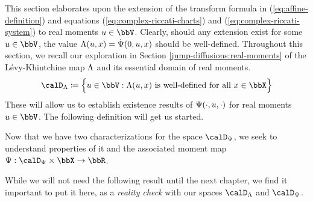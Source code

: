 This section elaborates upon the extension of the transform formula in (\ref{eq:affine-definition}) and equations (\ref{eq:complex-riccati-charts}) and (\ref{eq:complex-riccati-system}) to real moments $\momentVar \in \vecSpace$. 
Clearly, should any extension exist for some $\momentVar \in \vecSpace$, the value $\Lambda(u, x) = \dot{\Psi}(0,u,x)$ should be well-defined.
Throughout this section, we recall our exploration in Section \ref{jump-diffusions:real-moments} of the L\'evy-Khintchine map $\Lambda$ and its essential domain of real moments.
\begin{equation*}
  \odeSpace \defeq \Big\{ \momentVar \in \vecSpace : \ode(\momentVar, \stateVar) \text{ is well-defined for all } \stateVar \in \stateSpace \Big\}
\end{equation*}
These will allow us to establish existence results of $\Psi(\cdot, u, \cdot)$ for real moments $\momentVar \in \vecSpace$.
The following definition will get us started.





Now that we have two characterizations for the space $\momentSpace$, we seek to understand properties of it and the associated moment map $\aff: \momentSpace \times \stateSpace \rightarrow \bbR$.





While we will not need the following result until the next chapter, we find it important to put it here, as a \emph{reality check} with our spaces $\odeSpace$ and $\momentSpace$.


